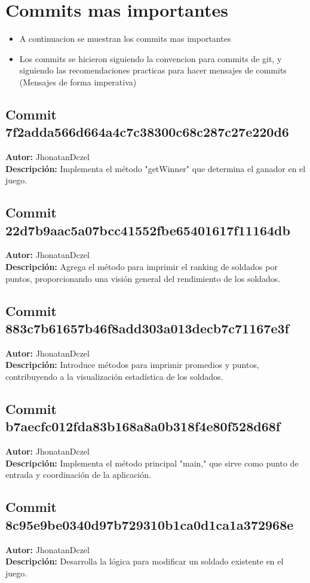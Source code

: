 \section{Commits mas importantes}
\begin{itemize}
  \item A continuacion se muestran los commits mas importantes
  \item Los commits se hicieron siguiendo la convencion para commits de git, y siguiendo las recomendaciones practicas para hacer mensajes de commits (Mensajes de forma imperativa)
\end{itemize}


\subsection*{Commit 7f2adda566d664a4c7c38300c68c287c27e220d6}
\textbf{Autor:} JhonatanDczel \\
\textbf{Descripción:} Implementa el método "getWinner" que determina el ganador en el juego.

\subsection*{Commit 22d7b9aac5a07bcc41552fbe65401617f11164db}
\textbf{Autor:} JhonatanDczel \\
\textbf{Descripción:} Agrega el método para imprimir el ranking de soldados por puntos, proporcionando una visión general del rendimiento de los soldados.

\subsection*{Commit 883c7b61657b46f8add303a013decb7c71167e3f}
\textbf{Autor:} JhonatanDczel \\
\textbf{Descripción:} Introduce métodos para imprimir promedios y puntos, contribuyendo a la visualización estadística de los soldados.

\subsection*{Commit b7aecfc012fda83b168a8a0b318f4e80f528d68f}
\textbf{Autor:} JhonatanDczel \\
\textbf{Descripción:} Implementa el método principal "main," que sirve como punto de entrada y coordinación de la aplicación.

\subsection*{Commit 8c95e9be0340d97b729310b1ca0d1ca1a372968e}
\textbf{Autor:} JhonatanDczel \\
\textbf{Descripción:} Desarrolla la lógica para modificar un soldado existente en el juego.

